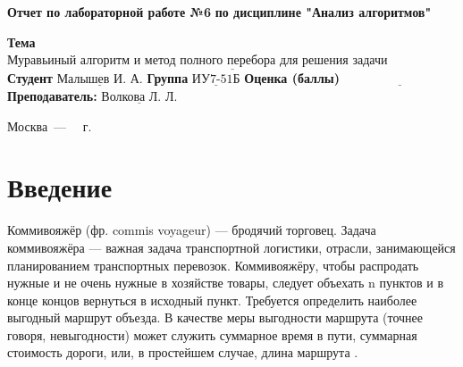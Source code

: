 \documentclass[12pt]{report}
\begin{document}
\begin{titlepage}
	
	\begin{center}
		\noindent\begin{minipage}{1.3\textwidth}\centering
			\Large\textbf{  Отчет по лабораторной работе №6}\newline
			\textbf{по дисциплине "Анализ алгоритмов"}\newline\newline
		\end{minipage}
	\end{center}
	
	\noindent\textbf{Тема} $\underline{\text{Муравьиный алгоритм и метод полного перебора для решения задачи коммивояжёра}}$\newline\newline
	\noindent\textbf{Студент} $\underline{\text{Малышев И. А.}}$\newline\newline
	\noindent\textbf{Группа} $\underline{\text{ИУ7-51Б}}$\newline\newline
	\noindent\textbf{Оценка (баллы)} $\underline{\text{~~~~~~~~~~~~~~~~~~~~~~~~~~~}}$\newline\newline
	\noindent\textbf{Преподаватель: } $\underline{\text{Волкова Л. Л.}}$\newline\newline\newline
	
	\begin{center}
		\vfill
		Москва~---~\the\year
		~г.
	\end{center}
\end{titlepage}


\renewcommand{\contentsname}{Содержание}
\tableofcontents
\setcounter{page}{2}

\newpage
\chapter*{Введение}
Коммивояжёр (фр. commis voyageur) — бродячий торговец. Задача коммивояжёра — важная задача транспортной логистики, отрасли, занимающейся планированием транспортных перевозок. Коммивояжёру, чтобы распродать нужные и не очень нужные в хозяйстве товары, следует объехать n пунктов и в конце концов вернуться в исходный пункт. Требуется определить наиболее выгодный маршрут объезда. В качестве меры выгодности маршрута (точнее говоря, невыгодности) может служить суммарное время в пути, суммарная стоимость дороги, или, в простейшем случае, длина маршрута \cite{commi1}.
\end{document}
